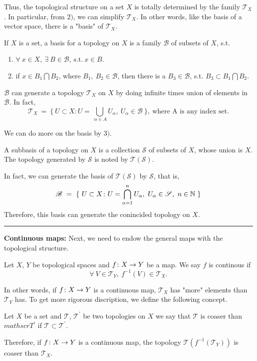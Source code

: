 \documentclass[a4paper,11pt]{report}
\begin{document}
Thus, the topological structure on a set $X$ is totally determined by the family $\mathscr{T}_X$. In particular, from $2)$, we can simplify $\mathscr{T}_X$. In other words, like the basis of a vector space, there is a "basis" of $\mathscr{T}_X$.

\begin{defn}
If $X$ is a set, a basis for a topology on $X$ is a family $\mathscr{B}$ of subsets of $X$, s.t.
	\begin{enumerate}[label=\arabic*)]
		\item $\forall ~ x \in X,~ \exists ~ B \in \mathscr{B},~\text{s.t.}~ x \in B$.
		\item if $x \in B_1 \bigcap B_2$, where $B_1,~B_2 \in \mathscr{B}$, then there is a $B_3 \in \mathscr{B}$, s.t. $B_3 \subset B_1 \bigcap B_2$.
	\end{enumerate}
\end{defn}

$\mathscr{B}$ can generate a topology $\mathscr{T}_X$ on $X$ by doing infinite times union of elements in $\mathscr{B}$. In fact,
\begin{equation*}
	\mathscr{T}_X~ = ~\{~U \subset X \colon U = \bigcup_{~\alpha \in A}U_\alpha,~U_\alpha \in \mathscr{B}~\},~ \text{where A is any index set.}
\end{equation*}

We can do more on the basis by $3)$.
\begin{defn}
A subbasis of a topology on $X$ is a collection $\mathscr{S}$ of subsets of $X$, whose union is $X$. The topology generated by $\mathscr{S}$ is noted by $\mathscr{T}(\mathscr{S})$.
\end{defn}
In fact, we can generate the basis of $\mathscr{T}(\mathscr{S})$ by $\mathscr{S}$, that is,
\begin{equation*}
	\mathscr{B}~ = ~\{~U \subset X \colon U = \bigcap_{\alpha=1}^{n}U_\alpha,~U_\alpha \in \mathscr{S},~n \in \mathbb{N}~\}
\end{equation*}
Therefore, this basis can generate the conincided topology on $X$.\vspace{0.2in}

\rule{1mm}{1mm} \textbf{Continuous maps:} Next, we need to endow the general maps with the topological structure.
\begin{defn}
Let $X$, $Y$ be topological spaces and $f \colon X \rightarrow Y$ be a map. We say $f$ is continous if
	\begin{equation*}
		\forall ~V \in \mathscr{T}_Y,~f^{-1}(V) \in \mathscr{T}_X.
	\end{equation*}
\end{defn} 
In other words, if $f \colon X \rightarrow Y$ is a continuous map, $\mathscr{T}_X$ has "more" elements than $\mathscr{T}_Y$ has. To get more rigorous discription, we define the following concept.
\begin{defn}
	Let $X$ be a set and $\mathscr{T}$, $\mathscr{T}^{'}$ be two topologies on $X$ we say that $\mathscr{T}$ is coaser than $mathscr{T}^{'}$ if $\mathscr{T} \subset \mathscr{T}^{'}$.
\end{defn}
Therefore, if $f \colon X \rightarrow Y$ is a continuous map, the topology $\mathscr{T}(f^{-1}(\mathscr{T}_Y))$ is coaser than $\mathscr{T}_X$. \vspace{0.1in}
\end{document}
